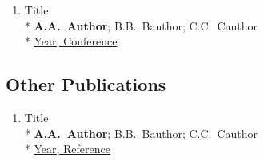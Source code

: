 \begin{enumerate}

\item
    Title \\*
    \nopagebreak \textbf{A.A.~Author}; B.B.~Bauthor; C.C.~Cauthor \\*
    \nopagebreak \href{https://ui.adsabs.harvard.edu/#abs/....}{Year, Conference}

\end{enumerate}



\subsection{Other Publications}
\vspace{2mm}

\begin{enumerate}

\item
    Title \\*
    \nopagebreak \textbf{A.A.~Author}; B.B.~Bauthor; C.C.~Cauthor \\*
    \nopagebreak \href{https://....}{Year, Reference}

\end{enumerate}

